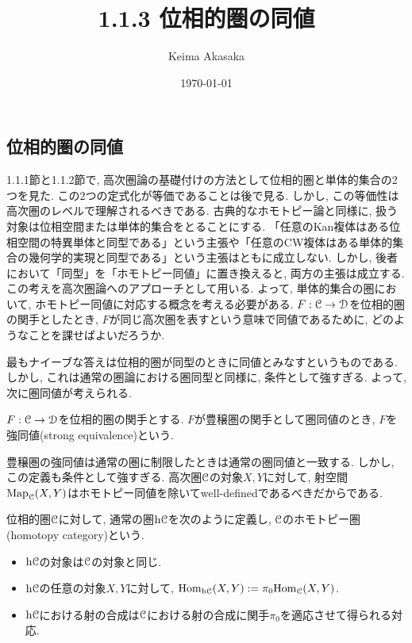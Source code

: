 \documentclass[uplatex, a4paper, 14Q, dvipdfmx]{jsreport}
\title{1.1.3 位相的圏の同値}
\author{Keima Akasaka}
\date{\today}
\begin{document}

\setcounter{chapter}{1}
\setcounter{section}{1} 
\setcounter{subsection}{2}   
\setcounter{subsubsection}{1}

\subsection{位相的圏の同値}

1.1.1節と1.1.2節で, 高次圏論の基礎付けの方法として位相的圏と単体的集合の2つを見た. 
この2つの定式化が等価であることは後で見る. 
しかし, この等価性は高次圏のレベルで理解されるべきである. 
古典的なホモトピー論と同様に, 扱う対象は位相空間または単体的集合をとることにする. 
「任意のKan複体はある位相空間の特異単体と同型である」という主張や「任意のCW複体はある単体的集合の幾何学的実現と同型である」という主張はともに成立しない. 
しかし, 後者において「同型」を「ホモトピー同値」に置き換えると, 両方の主張は成立する. 
この考えを高次圏論へのアプローチとして用いる. 
よって, 単体的集合の圏において, ホモトピー同値に対応する概念を考える必要がある. 
$F : \mathcal{C} \to \mathcal{D}$を位相的圏の関手としたとき, $F$が同じ高次圏を表すという意味で同値であるために, どのようなことを課せばよいだろうか.

最もナイーブな答えは位相的圏が同型のときに同値とみなすというものである.
しかし, これは通常の圏論における圏同型と同様に, 条件として強すぎる. 
よって, 次に圏同値が考えられる. 

\begin{definition}[強同値]
  $F : \mathcal{C} \to \mathcal{D}$を位相的圏の関手とする.
  $F$が豊穣圏の関手として圏同値のとき, $F$を強同値(strong equivalence)という.
\end{definition}

豊穣圏の強同値は通常の圏に制限したときは通常の圏同値と一致する.
しかし, この定義も条件として強すぎる.
高次圏$\mathcal{C}$の対象$X,Y$に対して, 射空間$\mathrm{Map}_{\mathcal{C}}(X,Y)$はホモトピー同値を除いてwell-definedであるべきだからである. 

\begin{definition}[位相的圏のホモトピー圏] \label{def.1.1.3.2}
  位相的圏$\mathcal{C}$に対して, 通常の圏$\mathrm{h}\mathcal{C}$を次のように定義し, $\mathcal{C}$のホモトピー圏(homotopy category)という.
  \begin{itemize}
    \item $\mathrm{h}\mathcal{C}$の対象は$\mathcal{C}$の対象と同じ.
    \item $\mathrm{h}\mathcal{C}$の任意の対象$X,Y$に対して, $\mathrm{Hom}_{\mathrm{h}\mathcal{C}}(X,Y) := \pi_0 \mathrm{Hom}_{\mathcal{C}}(X,Y)$.
    \item $\mathrm{h}\mathcal{C}$における射の合成は$\mathcal{C}$における射の合成に関手$\pi_0$を適応させて得られる対応.
  \end{itemize}
\end{definition}
\end{document}
